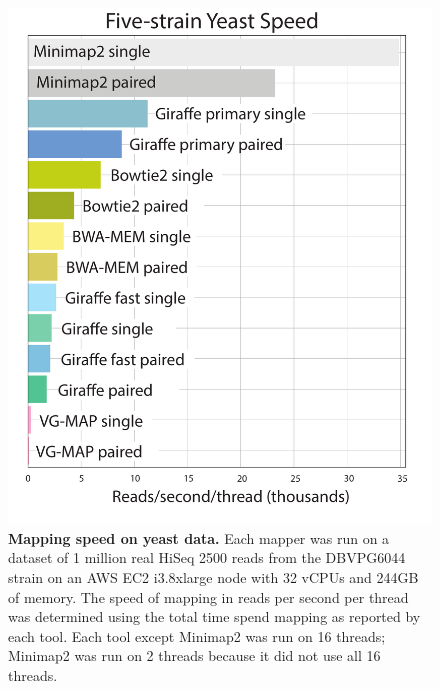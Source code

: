 \documentclass[11pt]{ucscthesis}
\begin{document}
\begin{figure}[H]
    \centering
    \includegraphics[width=.7\linewidth]{speed_yeast.pdf}
    \caption[Mapping speed on yeast data]{\textbf{Mapping speed on yeast data.} Each mapper was run on a dataset of 1 million real HiSeq 2500 reads from the DBVPG6044 strain on an AWS EC2 i3.8xlarge node with 32 vCPUs and 244GB of memory. The speed of mapping in reads per second per thread was determined using the total time spend mapping as reported by each tool. Each tool except Minimap2 was run on 16 threads; Minimap2 was run on 2 threads because it did not use all 16 threads.}
    \label{fig:speed_yeast}
\end{figure}
\end{document}
